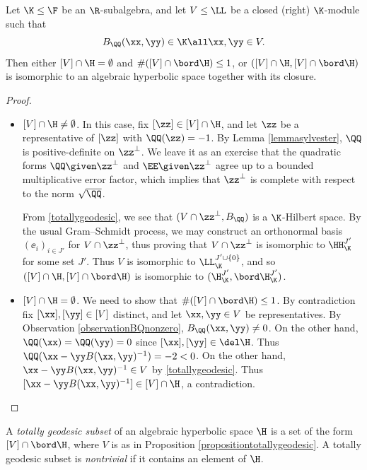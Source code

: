 \begin{proposition}
\label{propositiontotallygeodesic}
Let $\K\leq\F$ be an $\R$-subalgebra, and let $V\leq\LL$ be a closed (right) $\K$-module such that
\begin{equation}
\label{totallygeodesic}
B_\QQ(\xx,\yy)\in\K \all \xx,\yy\in V.
\end{equation}
Then either $[V]\cap\H = \emptyset$ and $\#([V]\cap\bord\H)\leq 1$, or $([V]\cap\H,[V]\cap\bord\H)$ is isomorphic to an algebraic hyperbolic space together with its closure.
\end{proposition}
\begin{proof}~
\begin{itemize}
\item[Case 1:] $[V]\cap\H\neq\emptyset$. In this case, fix $[\zz]\in [V]\cap\H$, and let $\zz$ be a representative of $[\zz]$ with $\QQ(\zz) = -1$. By Lemma \ref{lemmasylvester}, $\QQ$ is positive-definite on $\zz^\perp$. We leave it as an exercise that the quadratic forms $\QQ\given\zz^\perp$ and $\EE\given\zz^\perp$ agree up to a bounded multiplicative error factor, which implies that $\zz^\perp$ is complete with respect to the norm $\sqrt\QQ$.

From \eqref{totallygeodesic}, we see that $(V\cap\zz^\perp,B_\QQ)$ is a $\K$-Hilbert space. By the usual Gram--Schmidt process, we may construct an orthonormal basis $(\ee_i)_{i\in J'}$ for $V\cap\zz^\perp$, thus proving that $V\cap\zz^\perp$ is isomorphic to $\HH_\K^{J'}$ for some set $J'$. Thus $V$ is isomorphic to $\LL_\K^{J'\cup\{0\}}$, and so $([V]\cap\H,[V]\cap\bord\H)$ is isomorphic to $(\H_\K^{J'},\bord\H_\K^{J'})$.

\item[Case 2:] $[V]\cap\H = \emptyset$. We need to show that $\#([V]\cap\bord\H)\leq 1$. By contradiction fix $[\xx],[\yy]\in[V]$ distinct, and let $\xx,\yy\in V$ be representatives. By Observation \ref{observationBQnonzero}, $B_\QQ(\xx,\yy)\neq 0$. On the other hand, $\QQ(\xx) = \QQ(\yy) = 0$ since $[\xx],[\yy]\in\del\H$. Thus $\QQ(\xx - \yy B(\xx,\yy)^{-1}) = -2 < 0$. On the other hand, $\xx - \yy B(\xx,\yy)^{-1}\in V$ by \eqref{totallygeodesic}. Thus $[\xx - \yy B(\xx,\yy)^{-1}]\in [V]\cap\H$, a contradiction.
\end{itemize}
\end{proof}

\begin{definition}
\label{definitiontotallygeodesic}
A \emph{totally geodesic subset} of an algebraic hyperbolic space $\H$ is a set of the form $[V]\cap\bord\H$, where $V$ is as in Proposition \ref{propositiontotallygeodesic}. A totally geodesic subset is \emph{nontrivial} if it contains an element of $\H$.
\end{definition}

